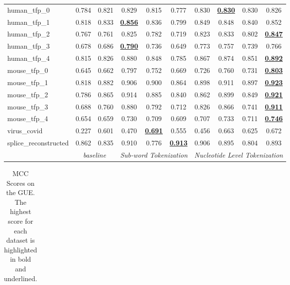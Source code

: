 \begin{table*}[h!]
\begin{center}
\begin{tabular}{l|cc|ccc|cccc}
human\_tfp\_0 & 0.784 & 0.821 & 0.829 & 0.815 & 0.777 & 0.830 & {\ul \textbf{0.830}} & 0.830 & 0.826 \\
human\_tfp\_1 & 0.818 & 0.833 & {\ul \textbf{0.856}} & 0.836 & 0.799 & 0.849 & 0.848 & 0.840 & 0.852 \\
human\_tfp\_2 & 0.767 & 0.761 & 0.825 & 0.782 & 0.719 & 0.823 & 0.833 & 0.802 & {\ul \textbf{0.847}} \\
human\_tfp\_3 & 0.678 & 0.686 & {\ul \textbf{0.790}} & 0.736 & 0.649 & 0.773 & 0.757 & 0.739 & 0.766 \\
human\_tfp\_4 & 0.815 & 0.826 & 0.880 & 0.848 & 0.785 & 0.867 & 0.874 & 0.851 & {\ul \textbf{0.892}} \\
mouse\_tfp\_0 & 0.645 & 0.662 & 0.797 & 0.752 & 0.669 & 0.726 & 0.760 & 0.731 & {\ul \textbf{0.803}} \\
mouse\_tfp\_1 & 0.818 & 0.882 & 0.906 & 0.900 & 0.864 & 0.898 & 0.911 & 0.897 & {\ul \textbf{0.923}} \\
mouse\_tfp\_2 & 0.786 & 0.865 & 0.914 & 0.885 & 0.840 & 0.862 & 0.899 & 0.849 & {\ul \textbf{0.921}} \\
mouse\_tfp\_3 & 0.688 & 0.760 & 0.880 & 0.792 & 0.712 & 0.826 & 0.866 & 0.741 & {\ul \textbf{0.911}} \\
mouse\_tfp\_4 & 0.654 & 0.659 & 0.730 & 0.709 & 0.609 & 0.707 & 0.733 & 0.711 & {\ul \textbf{0.746}} \\
virus\_covid & 0.227 & 0.601 & 0.470 & {\ul \textbf{0.691}} & 0.555 & 0.456 & 0.663 & 0.625 & 0.672 \\
splice\_reconstructed & 0.862 & 0.835 & 0.910 & 0.776 & {\ul \textbf{0.913}} & 0.906 & 0.895 & 0.804 & 0.893 \\
\hline
\multicolumn{1}{l|}{} & \multicolumn{2}{c|}{\textit{baseline}} & \multicolumn{3}{c|}{\textit{Sub-word Tokenization}} & \multicolumn{4}{c}{\textit{Nucleotide Level Tokenization}} \\ \hline
\end{tabular}
\end{center}
\end{table*}\begin{table*}[h!]
\small
\begin{center}
\caption{MCC Scores on the GUE. The highest score for each dataset is highlighted in bold and underlined.}
\label{table: GUE Results MCC}
\begin{tabular}{l|cc|ccc|cccc}
\hline

\end{tabular}
\end{center}
\end{table*}
